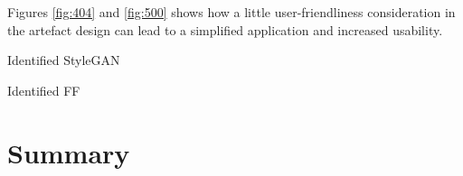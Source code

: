 Figures \ref{fig:404} and \ref{fig:500} shows how a little user-friendliness consideration in the artefact design can lead to a simplified application and increased usability. 


Identified StyleGAN

Identified FF



\section{Summary}